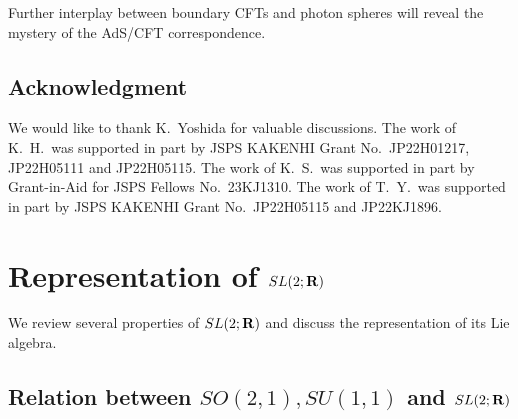 \documentclass[a4paper,11pt]{article}
\begin{document}
Further interplay between boundary CFTs and photon spheres will reveal the mystery of the AdS/CFT correspondence.



\subsection*{Acknowledgment}

We would like to thank K.~Yoshida for valuable discussions.
The work of K.~H.\ was supported in part by JSPS KAKENHI Grant No.~JP22H01217, JP22H05111 and JP22H05115.
The work of K.~S.\ was supported in part by Grant-in-Aid for JSPS Fellows No.~23KJ1310.
The work of T.~Y.\ was supported in part by JSPS KAKENHI Grant No.~JP22H05115 and JP22KJ1896.




\appendix




\newcommand{\beq}{\begin{eqnarray}}
\newcommand{\eeq}{\end{eqnarray}}
\newcommand{\del}{\partial}

\renewcommand{\ket}[1]{| {#1} \rangle}
\renewcommand{\bra}[1]{ \langle {#1} | }
\newcommand{\geom}[4]{F \left(\begin{array}{c} {#1}, {#2} \\ {#3}  \end{array} ; {#4} \right)}


\section{Representation of \texorpdfstring{$SL(2;{\bf R})$}{TEXT}}
\label{sec:A}


We review several properties of  $SL(2;{\bf R})$ and 
discuss the representation of its Lie algebra. 

\subsection{Relation between \texorpdfstring{$SO(2,1), SU(1,1)$}{TEXT} and \texorpdfstring{$SL(2;{\bf R})$}{TEXT}}
\end{document}
